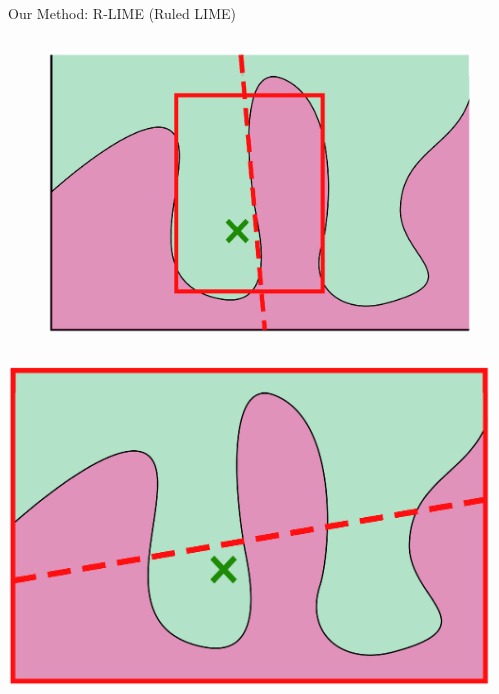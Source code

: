 \documentclass[unicode]{beamer}
\begin{document}
\begin{frame}
\begin{columns}[t]
\begin{column}{\rcol\linewidth}
\begin{block}{Our Method: R-LIME (Ruled LIME)}
\begin{columns}
\begin{column}{0.27\textwidth}
\begin{figure}
							\includegraphics[width=\textwidth]{src/img/visual-rlime3}
						\end{figure}
					\end{column}
				\end{columns}
				\vspace{1.25em}
				\begin{columns}
					\centering
					\begin{column}{.22\textwidth}
						\includegraphics[width=\textwidth]{src/img/visual-rlime1}
					\end{column}
					\begin{column}{.05\textwidth}
						\begin{center}
						\end{center}

\end{column}
\end{columns}
\end{block}
\end{column}
\end{columns}
\end{frame}
\end{document}

